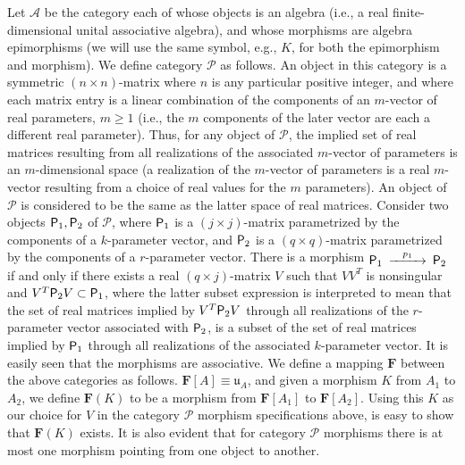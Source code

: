 \documentclass{amsart}
\numberwithin{equation}{section}
\theoremstyle{definition}
\numberwithin{theorem}{section}
\begin{document}
Let $\mathcal{A}$ be the category each of whose objects is an algebra (i.e., a real finite-dimensional unital associative algebra), and whose morphisms are algebra epimorphisms (we will use the same symbol, e.g., $K$, for both the epimorphism and morphism).  We define category $\mathcal{P}$ as follows. An object in this category is a symmetric $(n\times n)$-matrix where $n$ is any particular positive integer, and where each matrix entry is a linear combination of the components of an $m$-vector of real parameters, $m\ge 1$ (i.e., the $m$ components of the later vector are each a different real parameter).  Thus, for any object of $\mathcal{P}$, the implied set of real matrices resulting from all realizations of the associated $m$-vector of parameters is an $m$-dimensional space (a realization of the $m$-vector of parameters is a real $m$-vector resulting from a choice of real values for the $m$ parameters).  An object of $\mathcal{P}$ is considered to be the same as the latter space of real matrices.  Consider two objects ${\sf P}_1,{\sf P}_2$ of $\mathcal{P}$, where ${\sf P}_1$ is a $(j\times j)$-matrix parametrized by the components of a $k$-parameter vector, and ${\sf P}_2$ is a $(q\times q)$-matrix parametrized by the components of a $r$-parameter vector.  There is a morphism $ \begin{CD}  {\sf P}_1 @>p_1>> {\sf P}_2\end{CD}$ if and only if  there exists a real $(q\times j)$-matrix $V$ such that $VV^T$ is nonsingular and $V^T{\sf P}_2V\subset {\sf P}_1$, where the latter subset expression 
is interpreted to mean that the set of real matrices implied by $V^T{\sf P}_2V$ through all realizations of the $r$-parameter vector associated with ${\sf P}_2$, is a subset of  the set of real matrices implied by  ${\sf P}_1$ through all realizations of the associated $k$-parameter vector.  It is easily seen that the morphisms are associative.  We define a mapping $\mathbf{F}$ between the above categories as follows.  $\mathbf{F}[
A] \equiv \mathfrak{u}_A$, and given a morphism $K$ from $A_1$ to $A_2$, we define $\mathbf{F}(K)$ to be a morphism from $\mathbf{F}[A_1]$ to $\mathbf{F}[A_2]$.  Using this $K$ as our choice for $V$ in the category $\mathcal{P}$ morphism specifications above, is easy to show that $\mathbf{F}(K)$ exists. It is also evident that for category $\mathcal{P}$ morphisms there is at most one morphism pointing from one object to another.
\end{document}
